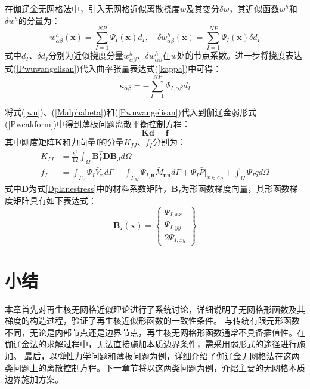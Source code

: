 在伽辽金无网格法中，引入无网格近似离散挠度$w$及其变分$\delta w$，其近似函数$w^h$和$\delta w^h$的分量为：
\begin{equation}
\label{Pwuwangelisan}
    w_{\alpha\beta}^h(\pmb{x})=\sum_{I=1}^{N\!P}\Psi_I(\pmb{x})d_I,\quad \delta w_{\alpha\beta}^h(\pmb{x})=\sum_{I=1}^{N\!P}\Psi_I(\pmb{x})\delta d_I
\end{equation}
式中$d_I$、$\delta d_I$分别为近似挠度分量$w_{\alpha\beta}^h$、$\delta w_{\alpha\beta}^h$在$w$处的节点系数。进一步将挠度表达式(\ref{Pwuwangelisan})代入曲率张量表达式(\ref{kappa})中可得：
\begin{equation}
\kappa_{\alpha\beta}=-\sum_{I=1}^{N\!P}\Psi_{I,\alpha\beta}d_I
\end{equation}\par
将式(\ref{wn})、(\ref{Malphabeta})和(\ref{Pwuwangelisan})代入到伽辽金弱形式(\ref{Pweakform})中得到薄板问题离散平衡控制方程：
\begin{equation}
     \pmb{K}\pmb{d}=\pmb{f}
\end{equation}
其中刚度矩阵$\boldsymbol K$和力向量$\pmb f$的分量$K_{IJ}$、$f_I$分别为：
\begin{subequations}\label{PKf}
\begin{align}
    \label{PKf1}K_{I\!J}&=\frac{h^3}{12}\int_{\Omega}\pmb{B}^T_I\pmb{D}\pmb{B}_Jd\Omega\\
    \label{PKf2}f_I&=\int_{\Gamma_V}\Psi_I\bar{V}_{\pmb{n}}d\Gamma-\int_{\Gamma_M}\Psi_{I,\pmb{n}}\bar{M}_{\pmb{nn}}d\Gamma+\Psi_I\bar{P}\vert_{x\in c_P}+\int_{\Omega}\Psi_I\bar{q}d\Omega
\end{align}
\end{subequations}
式中$\pmb{D}$为式\ref{Dplanestress}中的材料系数矩阵，$\pmb{B}_I$为形函数梯度向量，其形函数梯度矩阵具有如下表达式：
\begin{equation}
\pmb{B}_I(\pmb{x})= \begin{Bmatrix}\Psi_{I,xx}\\\Psi_{I,yy}\\2\Psi_{I,xy}\end{Bmatrix} 
\end{equation}
\section{小结}
本章首先对再生核无网格近似理论进行了系统讨论，详细说明了无网格形函数及其梯度的构造过程，验证了再生核近似形函数的一致性条件。
与传统有限元形函数不同，无论是内部节点还是边界节点，再生核无网格形函数通常不具备插值性。在伽辽金法的求解过程中，无法直接施加本质边界条件，需采用弱形式的途径进行施加。
最后，以弹性力学问题和薄板问题为例，详细介绍了伽辽金无网格法在这两类问题上的离散控制方程。下一章节将以这两类问题为例，介绍主要的无网格本质边界施加方案。
